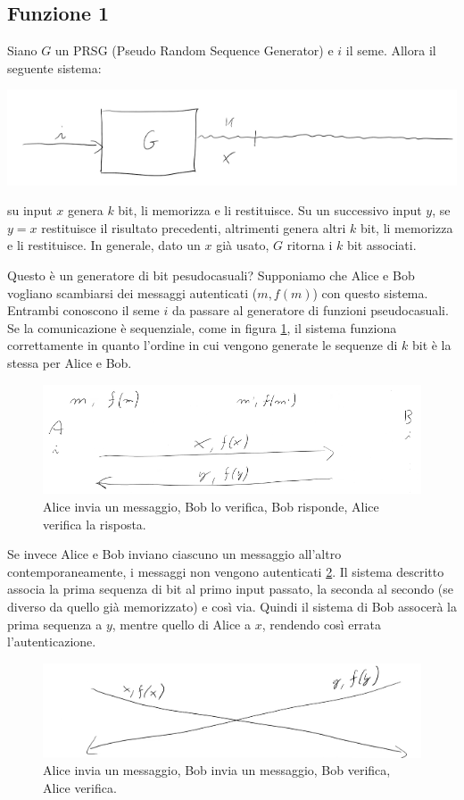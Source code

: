 \subsection{Funzione 1}
Siano $G$ un PRSG (Pseudo Random Sequence Generator) e $i$ il seme. Allora il seguente sistema:
\begin{center}
    \includegraphics[width=1\textwidth]{images/fun1.png}
\end{center}
\noindent su input $x$ genera $k$ bit, li memorizza e li restituisce. Su un successivo input $y$, se $y = x$ restituisce il risultato precedenti, altrimenti genera altri $k$ bit, li memorizza e li restituisce. In generale, dato un $x$ già usato, $G$ ritorna i $k$ bit associati.

Questo è un generatore di bit pesudocasuali? Supponiamo che Alice e Bob vogliano scambiarsi dei messaggi autenticati ($m, f(m)$) con questo sistema. Entrambi conoscono il seme $i$ da passare al generatore di funzioni pseudocasuali. Se la comunicazione è sequenziale, come in figura \ref{fig:fun1-1}, il sistema funziona correttamente in quanto l'ordine in cui vengono generate le sequenze di $k$ bit è la stessa per Alice e Bob. 
\begin{figure}
    \centering
    \includegraphics[width=1\textwidth]{images/fun1-1.png}
    \caption{Alice invia un messaggio, Bob lo verifica, Bob risponde, Alice verifica la risposta.}
    \label{fig:fun1-1}
\end{figure}

Se invece Alice e Bob inviano ciascuno un messaggio all'altro contemporaneamente, i messaggi non vengono autenticati \ref{fig:fun1-2}. Il sistema descritto associa la prima sequenza di bit al primo input passato, la seconda al secondo (se diverso da quello già memorizzato) e così via. Quindi il sistema di Bob assocerà la prima sequenza a $y$, mentre quello di Alice a $x$, rendendo così errata l'autenticazione. 
\begin{figure}
    \centering
    \includegraphics[width=1\textwidth]{images/fun1-2.png}
    \caption{Alice invia un messaggio, Bob invia un messaggio, Bob verifica, Alice verifica.}
    \label{fig:fun1-2}
\end{figure}

